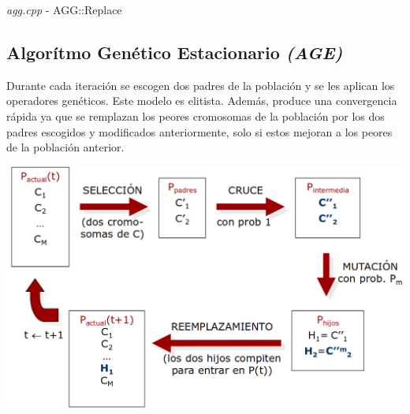 \documentclass[a4paper, 12pt]{article}
\begin{document}
      \begin{algorithm}[H]
       	\caption{\textit{agg.cpp} - AGG::Replace}
       	
      \end{algorithm}
      
      
      
      
      
      
      \newpage
      \subsection{Algorítmo Genético Estacionario \textit{(AGE)}}
      Durante cada iteración se escogen dos padres de la población y se les aplican los operadores genéticos. Este modelo es elitista. Además, produce una convergencia rápida ya que se remplazan los peores cromosomas de la población por los dos padres escogidos y modificados anteriormente, solo si estos mejoran a los peores de la población anterior.
      \begin{center}
      	\includegraphics[scale=0.3]{esquema-age}
      \end{center}
      
\end{document}
